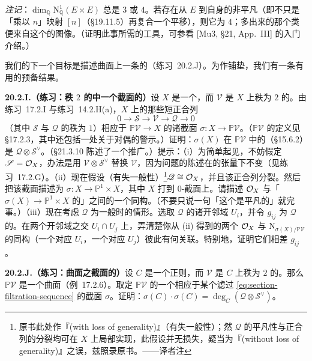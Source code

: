 \emph{注记}：$\dim_{\mathbb{Q}}\mathrm{N}^1_{\mathbb{Q}}(E\times E)$ 总是 $3$ 或 $4$。若存在从 $E$ 到自身的非平凡\trEndomorphism（即不只是「乘以 $n$」映射 $[n]$（\S19.11.5）再复合一个平移），则它为 $4$；多出来的那个类便来自这个\trEndomorphism{}的图像。（证明此事所需的工具，可参看 [Mu3, \S21, App.~III] 的入门介绍。）

我们的下一个目标是描述\trRuling{}曲面上一条\trCurve{}的\trSelfIntersection（\mbox{练习~20.2.J}）。为作铺垫，我们有一条有用的预备结果。

\textbf{20.2.I.（练习：秩 $2$ \trVectorBundle{}的\trProjectivization{}中一个截面的\trNormalBundle）}\quad 设 $X$ 是一个\trScheme，而 $\mathscr{V}$ 是 $X$ 上秩为 $2$ 的\trLocallyFreeSheaf。由\mbox{练习~17.2.I} 与\mbox{练习~14.2.H(a)}，$X$ 上的那些短正合列
\begin{equation*}\tag{20.2.9.1}\label{eq:section-filtration-sequence}
0\longrightarrow\mathscr{S}\longrightarrow\mathscr{V}\longrightarrow\mathscr{Q}\longrightarrow 0
\end{equation*}
（其中 $\mathscr{S}$ 与 $\mathscr{Q}$ 的秩为 $1$）相应于\trProjection{} $\mathbb{P}\mathscr{V}\to X$ 的诸截面 $\sigma\colon X\to\mathbb{P}\mathscr{V}$。（$\mathbb{P}\mathscr{V}$ 的定义见 \S17.2.3，其中还包括一处关于对偶的警示。）证明：$\sigma(X)$ 在 $\mathbb{P}\mathscr{V}$ 中的\trNormalBundle{}（\S15.6.2）是 $\mathscr{Q}\otimes\mathscr{S}^{\vee}$。（\S21.3.10 陈述了一个推广。）提示：（i）为简单起见，不妨假定 $\mathscr{S}=\mathcal{O}_X$，办法是用 $\mathscr{V}\otimes\mathscr{S}^{\vee}$ 替换 $\mathscr{V}$，因为问题的陈述在\trInvertibleSheaf{}的张量下不变（见\mbox{练习~17.2.G}）。（ii）现在假设（有失一般性）\footnote{原书此处作『(with loss of generality)』（有失一般性）；然 $\mathscr{Q}$ 的平凡性与正合列的分裂均可在 $X$ 上局部实现，此假设并无损失，疑当为『(without loss of generality)』之误，兹照录原书。——译者注}$\mathscr{Q}\cong\mathcal{O}_X$，并且该正合列分裂。然后把该截面描述为 $\sigma\colon X\to\mathbb{P}^1\times X$，其中 $X$ 打到 $0$-截面上。请描述 $\mathcal{O}_X$ 与「$\sigma(X)\to\mathbb{P}^1\times X$ 的\trNormalBundle」之间的一个同构。（不要只说一句「这个\trNormalBundle{}是平凡的」就完事。）（iii）现在考虑 $\mathscr{Q}$ 为一般时的情形。选取 $\mathscr{Q}$ 的诸\trTrivialization{}开邻域 $U_i$，并令 $g_{ij}$ 为 $\mathscr{Q}$ 的\trTransitionFunction。在两个\trTrivialization{}开邻域之交 $U_i\cap U_j$ 上，弄清楚你从 (ii) 得到的两个 $\mathcal{O}_X$ 与 $\mathrm{N}_{\sigma(X)/\mathbb{P}\mathscr{V}}$ 的同构（一个对应 $U_i$，一个对应 $U_j$）彼此有何关联。特别地，证明它们相差 $g_{ij}$。

\textbf{20.2.J.（练习：\trRuling{}曲面之截面的\trSelfIntersection）}\quad 设 $C$ 是一个正则\trCurve，而 $\mathscr{V}$ 是 $C$ 上秩为 $2$ 的\trLocallyFreeSheaf。那么 $\mathbb{P}\mathscr{V}$ 是一个\trRuling{}曲面（\mbox{例~17.2.6}）。取定 $\mathbb{P}\mathscr{V}$ 的一个相应于某个滤过 \eqref{eq:section-filtration-sequence} 的截面 $\sigma$。证明：$\sigma(C)\cdot\sigma(C)=\deg_C(\mathscr{Q}\otimes\mathscr{S}^{\vee})$。

